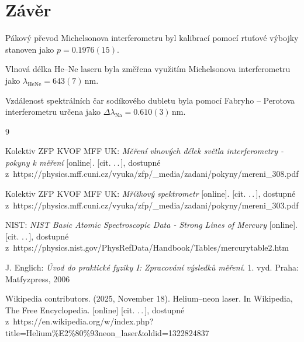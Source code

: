 \documentclass{../concepts/titul_protokol_p/prepareprotokol} %
\renewcommand{\today}{\number\day.\,\number\month.\,\number\year}
\begin{document}
\section{Závěr}

Pákový převod Michelsonova interferometru byl kalibrací pomocí rtuťové výbojky stanoven
jako $p = 0.1976(15)$.

Vlnová délka He--Ne laseru byla změřena využitím Michelsonova interferometru
jako $\lambda_\mathrm{HeNe} = 643(7)\,\unit{\nm}$.

Vzdálenost spektrálních čar sodíkového dubletu byla pomocí Fabryho -- Perotova interferometru určena
jako $\Delta \lambda_{\mathrm{Na}} = 0.610(3)\,\unit{\nm}$.

\begin{thebibliography}{9}

 Kolektiv ZFP KVOF MFF UK: \textit{Měření vlnových délek světla 
interferometry - pokyny k měření} [online]. [cit. \today], dostupné
z~https://physics.mff.cuni.cz/vyuka/zfp/\_media/zadani/pokyny/mereni\_308.pdf

 Kolektiv ZFP KVOF MFF UK: \textit{Mřížkový spektrometr} [online]. [cit. \today], dostupné
z~https://physics.mff.cuni.cz/vyuka/zfp/\_media/zadani/pokyny/mereni\_303.pdf

 NIST: \textit{NIST Basic Atomic Spectroscopic Data - Strong Lines of Mercury} [online]. [cit. \today], 
dostupné z~https://physics.nist.gov/PhysRefData/Handbook/Tables/mercurytable2.htm

 J. Englich: \textit{Úvod do praktické fyziky I: Zpracování výsledků měření}. 
1. vyd. Praha: Matfyzpress, 2006

 Wikipedia contributors. (2025, November 18). Helium--neon laser. 
In Wikipedia, The Free Encyclopedia. [online] [cit. \today], dostupné 
z~https://en.wikipedia.org/w/index.php?title=Helium\%E2\%80\%93neon\_laser\&oldid=1322824837


\end{thebibliography}
\end{document}
